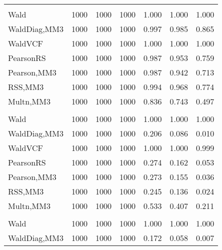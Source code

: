 \documentclass[
]{article}
\begin{document}
\begin{table}[H]
{\begin{tabular}[t]{lrrrrrr}
\addlinespace[0.3em]
\multicolumn{7}{l}{\textbf{1F 15V}}\\
\hspace{1em}Wald & 1000 & 1000 & 1000 & 1.000 & 1.000 & \vphantom{2} 1.000\\
\hspace{1em}WaldDiag,MM3 & 1000 & 1000 & 1000 & 0.997 & 0.985 & 0.865\\
\hspace{1em}WaldVCF & 1000 & 1000 & 1000 & 1.000 & 1.000 & 1.000\\
\hspace{1em}PearsonRS & 1000 & 1000 & 1000 & 0.987 & 0.953 & 0.759\\
\hspace{1em}Pearson,MM3 & 1000 & 1000 & 1000 & 0.987 & 0.942 & 0.713\\
\hspace{1em}RSS,MM3 & 1000 & 1000 & 1000 & 0.994 & 0.968 & 0.774\\
\hspace{1em}Multn,MM3 & 1000 & 1000 & 1000 & 0.836 & 0.743 & 0.497\\
\addlinespace[0.3em]
\multicolumn{7}{l}{\textbf{2F 10V}}\\
\hspace{1em}Wald & 1000 & 1000 & 1000 & 1.000 & 1.000 & \vphantom{1} 1.000\\
\hspace{1em}WaldDiag,MM3 & 1000 & 1000 & 1000 & 0.206 & 0.086 & 0.010\\
\hspace{1em}WaldVCF & 1000 & 1000 & 1000 & 1.000 & 1.000 & 0.999\\
\hspace{1em}PearsonRS & 1000 & 1000 & 1000 & 0.274 & 0.162 & 0.053\\
\hspace{1em}Pearson,MM3 & 1000 & 1000 & 1000 & 0.273 & 0.155 & 0.036\\
\hspace{1em}RSS,MM3 & 1000 & 1000 & 1000 & 0.245 & 0.136 & 0.024\\
\hspace{1em}Multn,MM3 & 1000 & 1000 & 1000 & 0.533 & 0.407 & 0.211\\
\addlinespace[0.3em]
\multicolumn{7}{l}{\textbf{3F 15V}}\\
\hspace{1em}Wald & 1000 & 1000 & 1000 & 1.000 & 1.000 & 1.000\\
\hspace{1em}WaldDiag,MM3 & 1000 & 1000 & 1000 & 0.172 & 0.058 & 0.007\\

\end{tabular}}
\end{table}
\end{document}
